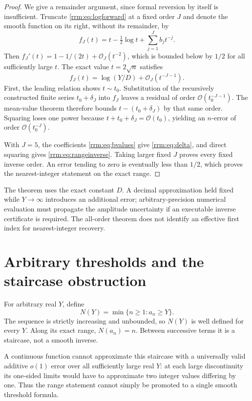 \documentclass[11pt]{article}
\theoremstyle{remark}\newtheorem{remark}[theorem]{Remark}
\newcommand{\OO}{\mathcal O}
\begin{document}
\begin{proof}
We give a remainder argument, since formal reversion by itself is insufficient. Truncate \eqref{rrm:eq:logforward} at a fixed order $J$ and denote the smooth function on its right, without its remainder, by
\[
 f_J(t)=t-\tfrac12\log t+\sum_{j=1}^Jb_jt^{-j}.
\]
Then $f_J'(t)=1-1/(2t)+\OO_J(t^{-2})$, which is bounded below by $1/2$ for all sufficiently large $t$. The exact value $t=2\sqrt n$ satisfies
\[
 f_J(t)=\log(Y/D)+\OO_J(t^{-J-1}).
\]
First, the leading relation shows $t\sim t_0$. Substitution of the recursively constructed finite series $t_0+\delta_J$ into $f_J$ leaves a residual of order $\OO(t_0^{-J-1})$. The mean-value theorem therefore bounds $t-(t_0+\delta_J)$ by that same order. Squaring loses one power because $t+t_0+\delta_J=\OO(t_0)$, yielding an $n$-error of order $\OO(t_0^{-J})$.

With $J=5$, the coefficients \eqref{rrm:eq:bvalues} give \eqref{rrm:eq:delta}, and direct squaring gives \eqref{rrm:eq:rangeinverse}. Taking larger fixed $J$ proves every fixed inverse order. An error tending to zero is eventually less than $1/2$, which proves the nearest-integer statement on the exact range.
\end{proof}

The theorem uses the exact constant $D$. A decimal approximation held fixed while $Y\to\infty$ introduces an additional error; arbitrary-precision numerical evaluation must propagate the amplitude uncertainty if an executable inverse certificate is required. The all-order theorem does not identify an effective first index for nearest-integer recovery.

\section{Arbitrary thresholds and the staircase obstruction}\label{rrm:sec:threshold}
For arbitrary real $Y$, define
\begin{equation}\label{rrm:eq:threshold}
 N(Y)=\min\{n\ge1:a_n\ge Y\}.
\end{equation}
The sequence is strictly increasing and unbounded, so $N(Y)$ is well defined for every $Y$. Along its exact range, $N(a_n)=n$. Between successive terms it is a staircase, not a smooth inverse.

A continuous function cannot approximate this staircase with a universally valid additive $o(1)$ error over all sufficiently large real $Y$: at each large discontinuity its one-sided limits would have to approximate two integer values differing by one. Thus the range statement cannot simply be promoted to a single smooth threshold formula.
\end{document}
